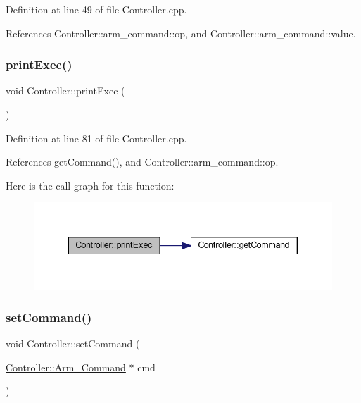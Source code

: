 Definition at line 49 of file Controller.\+cpp.



References Controller\+::arm\+\_\+command\+::op, and Controller\+::arm\+\_\+command\+::value.

\mbox{\label{class_controller_a658aa1846a4b44a9f79578ee017a1116}} 
\subsubsection{\texorpdfstring{print\+Exec()}{printExec()}}
{\footnotesize\ttfamily void Controller\+::print\+Exec (\begin{DoxyParamCaption}{ }\end{DoxyParamCaption})}



Definition at line 81 of file Controller.\+cpp.



References get\+Command(), and Controller\+::arm\+\_\+command\+::op.

Here is the call graph for this function\+:\nopagebreak
\begin{figure}[H]
\begin{center}
\leavevmode
\includegraphics[width=343pt]{class_controller_a658aa1846a4b44a9f79578ee017a1116_cgraph}
\end{center}
\end{figure}
\mbox{\label{class_controller_a59b53351b9037c5cd186e9d32ca37baa}} 
\subsubsection{\texorpdfstring{set\+Command()}{setCommand()}}
{\footnotesize\ttfamily void Controller\+::set\+Command (\begin{DoxyParamCaption}\item[{\hyperlink{class_controller_a1b06b7601d97a4d4bb4071938df87076}{Controller\+::\+Arm\+\_\+\+Command} $\ast$}]{cmd }\end{DoxyParamCaption})}


